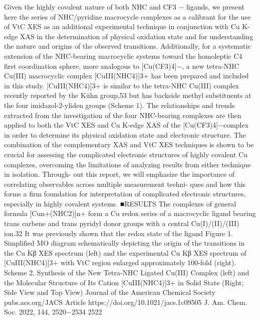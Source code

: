 \documentclass{article}
\begin{document}
\newpage


Given the highly covalent nature of both NHC and CF3
−
ligands, we present here the series of NHC/pyridine
macrocycle complexes as a calibrant for the use of VtC XES
as an additional experimental technique in conjunction with
Cu K-edge XAS in the determination of physical oxidation
state and for understanding the nature and origins of the
observed transitions. Additionally, for a systematic extension of
the NHC-bearing macrocyclic systems toward the homoleptic
C4 ﬁrst coordination sphere, more analogous to [Cu(CF3)4]−,
a
new
tetra-NHC
Cu(III)
macrocyclic
complex
[CuIII(NHC4)]3+ has been prepared and included in this
study. [CuIII(NHC4)]3+ is similar to the tetra-NHC Cu(III)
complex recently reported by the Kühn group,53 but has
backside methyl substituents at the four imidazol-2-yliden
groups (Scheme 1). The relationships and trends extracted
from the investigation of the four NHC-bearing complexes are
then applied to both the VtC XES and Cu K-edge XAS of the
[Cu(CF3)4]−complex in order to determine its physical
oxidation state and electronic structure. The combination of
the complementary XAS and VtC XES techniques is shown to
be crucial for assessing the complicated electronic structures of
highly covalent Cu complexes, overcoming the limitations of
analyzing results from either technique in isolation. Through-
out this report, we will emphasize the importance of
correlating observables across multiple measurement techni-
ques and how this forms a ﬁrm foundation for interpretation of
complicated electronic structures, especially in highly covalent
systems.
■RESULTS
The complexes of general formula [Cun+(NHC2)]n+ form a Cu
redox series of a macrocyclic ligand bearing trans carbene and
trans pyridyl donor groups with a central Cu(I)/(II)/(III)
ion.32 It was previously shown that the redox state of the ligand
Figure 1. Simpliﬁed MO diagram schematically depicting the origin of the transitions in the Cu Kβ XES spectrum (left) and the experimental Cu
Kβ XES spectrum of [CuIII(NHC4)]3+ with VtC region enlarged approximately 100-fold (right).
Scheme 2. Synthesis of the New Tetra-NHC Ligated Cu(III) Complex (left) and the Molecular Structure of Its Cation
[CuIII(NHC4)]3+ in Solid State (Right; Side View and Top View)
Journal of the American Chemical Society
pubs.acs.org/JACS
Article
https://doi.org/10.1021/jacs.1c09505
J. Am. Chem. Soc. 2022, 144, 2520−2534
2522

\newpage

\end{document}
